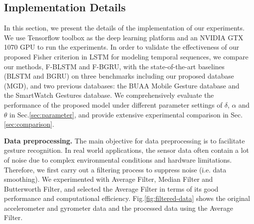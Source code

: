 \documentclass[review]{elsarticle}
\begin{document}
\subsection{Implementation Details}\label{sec:preprocess}%
In this section, we present the details of the implementation of our experiments. We use Tensorflow toolbox as the deep learning platform and an NVIDIA GTX 1070 GPU to run the experiments. In order to validate the effectiveness of our proposed Fisher criterion in LSTM for modeling temporal sequences, we compare our methods, F-BLSTM and F-BGRU, with the state-of-the-art baselines (BLSTM and BGRU\;\cite{chung2014eprint}) on three benchmarks including our proposed database (MGD), and two previous databases: the BUAA Mobile Gesture database\;\cite{xie2016ccbr} and the SmartWatch Gestures database\;\cite{chung2014eprint}. We comprehensively evaluate the performance of the proposed model under different parameter settings of $\delta$, $\alpha$ and $\theta$ in Sec.\;\ref{sec:parameter}, and provide extensive experimental comparison in Sec.\;\ref{sec:comparison}.

\textbf{Data preprocessing.} The main objective for data preprocessing is to facilitate gesture recognition. In real world applications, the sensor data often contain a lot of noise due to complex environmental conditions and hardware limitations. Therefore, we first carry out a filtering process to suppress noise (i.e. data smoothing). We experimented with Average Filter, Median Filter and Butterworth Filter, and selected the Average Filter in terms of its good performance and computational efficiency. Fig.\;\ref{fig:filtered-data} shows the original accelerometer and gyrometer data and the processed data using the Average Filter.

\begin{figure*}[htbp]
	\normalsize
	\centering
	\\
	\\
	\caption{The original accelerometer and gyrometer data vs. the processed data by Moving Average Filter.}
	\label{fig:filtered-data}
	\vspace*{4pt}
\end{figure*}
\end{document}
